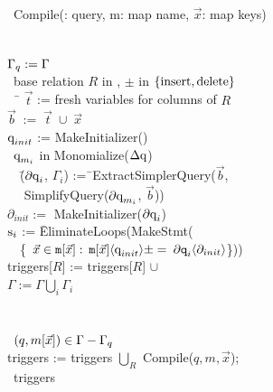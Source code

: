 {\vspace{-1mm}
\begin{tabbing}
\alg\ Compile(\q: query, m: map name, $\vec{x}$: map keys) \\
\\
 \\
$\Gamma_{q} := \Gamma$\\
\algforeach\ base relation $R$ in \q,
               $\pm$ in $\{\mbox{insert},\mbox{delete}\}$
\algdo \\
~~\= $\vec{t}$ := fresh variables for columns of $R$
     \\
  \> $\vec{b} \; := \; \vec{t} \; \cup \; \vec{x}$
     $\qquad \qquad \qquad \qquad \qquad$ \\
  \> $\mbox{q}_{init}$ := MakeInitializer(\q)\\
  \> \algforeach\ $\mbox{q}_{m_i}$ in Monomialize($\Delta\mbox{q}$) \algdo\\
\>~~\= ($\partial\mbox{q}_i$, $\Gamma_i$) :=\=\ ExtractSimplerQuery($\vec{b}$,\\
  \>\>\> ~~ SimplifyQuery($\partial\mbox{q}_{m_i}$, $\vec{b}$))\\
  \>\> $\partial_{init} := $ MakeInitializer($\partial\mbox{q} _i$)\\
  \>\> $\mbox{s}_i$ := \= EliminateLoops(MakeStmt(\\
  \>\>\> ~~\{\codeforeach\ $\vec{x} \in \codev{m} [\vec{x}]:$
  $\codev{m} [\vec{x}]\tuple{\v{\q}_{init}} \pm = $
  $\partial\codev{q} _{i}\tuple{\partial_{init}}$\}))\\
  \>\> triggers[$R$] := triggers[$R$] $\cup$ \\
  \>\> $\Gamma := \Gamma \bigcup_i \Gamma_i$
  \ \ \ \ \\
  \>\algdone\\
\algdone\\
\algforeach\ $(q, m[\vec{x}]) \in \Gamma - \Gamma_{q}$ \algdo\\
  \> triggers := triggers $\bigcup_{R}$ Compile($q, m, \vec{x}$); \\
\comment{\algdone\\}
\algreturn\ triggers
\end{tabbing}


}
